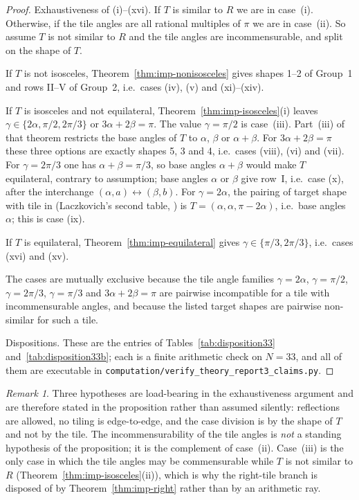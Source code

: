 \documentclass[11pt]{amsart}
\theoremstyle{definition}
\theoremstyle{remark}
\newtheorem{remark}[theorem]{Remark}
\newcommand{\pathcode}[1]{\nolinkurl{#1}}
\begin{document}
\begin{proof}
Exhaustiveness of \textup{(i)--(xvi)}.  If $T$ is similar to $R$ we are in
case~(i).  Otherwise, if the tile angles are all rational multiples of $\pi$
we are in case~(ii).  So assume $T$ is not similar to $R$ and the tile angles
are incommensurable, and split on the shape of $T$.

If $T$ is not isosceles, Theorem~\ref{thm:imp-nonisosceles} gives shapes 1--2
of Group~1 and rows II--V of Group~2, i.e.\ cases (iv), (v) and
(xi)--(xiv).

If $T$ is isosceles and not equilateral, Theorem~\ref{thm:imp-isosceles}(i)
leaves $\gamma\in\{2\alpha,\pi/2,2\pi/3\}$ or $3\alpha+2\beta=\pi$.  The
value $\gamma=\pi/2$ is case~(iii).  Part~(iii) of that theorem restricts the
base angles of $T$ to $\alpha$, $\beta$ or $\alpha+\beta$.  For
$3\alpha+2\beta=\pi$ these three options are exactly shapes 5, 3 and 4, i.e.\
cases (viii), (vi) and (vii).  For $\gamma=2\pi/3$ one has
$\alpha+\beta=\pi/3$, so base angles $\alpha+\beta$ would make $T$
equilateral, contrary to assumption; base angles $\alpha$ or $\beta$ give
row~I, i.e.\ case (x), after the interchange $(\alpha,a)\leftrightarrow
(\beta,b)$.  For $\gamma=2\alpha$, the pairing of target shape with tile in
\cite[Table~4]{Beeson7} (Laczkovich's second table,
\cite[Thm.~4.1]{Lacz95}) is $T=(\alpha,\alpha,\pi-2\alpha)$, i.e.\ base
angles $\alpha$; this is case (ix).

If $T$ is equilateral, Theorem~\ref{thm:imp-equilateral} gives
$\gamma\in\{\pi/3,2\pi/3\}$, i.e.\ cases (xvi) and (xv).

The cases are mutually exclusive because the tile angle families
$\gamma=2\alpha$, $\gamma=\pi/2$, $\gamma=2\pi/3$, $\gamma=\pi/3$ and
$3\alpha+2\beta=\pi$ are pairwise incompatible for a tile with
incommensurable angles, and because the listed target shapes are pairwise
non-similar for such a tile.

Dispositions.  These are the entries of Tables~\ref{tab:disposition33} and~\ref{tab:disposition33b};
each is a finite arithmetic check on $N=33$, and all of them are executable
in \pathcode{computation/verify_theory_report3_claims.py}.
\end{proof}

\begin{remark}
Three hypotheses are load-bearing in the exhaustiveness argument and are
therefore stated in the proposition rather than assumed silently:
reflections are allowed, no tiling is edge-to-edge, and the case division is
by the shape of $T$ and not by the tile.  The incommensurability of the tile
angles is \emph{not} a standing hypothesis of the proposition; it is the
complement of case~(ii).  Case~(iii) is the only case in which the tile
angles may be commensurable while $T$ is not similar to $R$
\textup{(}Theorem~\ref{thm:imp-isosceles}(ii)\textup{)}, which is why the
right-tile branch is disposed of by Theorem~\ref{thm:imp-right} rather than
by an arithmetic ray.
\end{remark}
\end{document}
